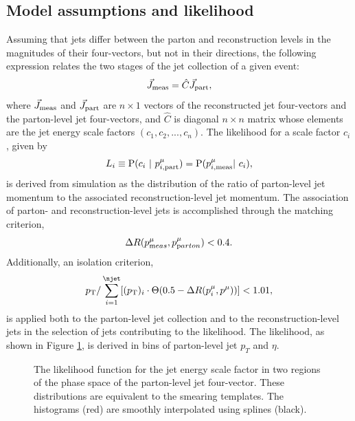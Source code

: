 \subsection{Model assumptions and likelihood} 
Assuming that jets differ between the parton and reconstruction levels in the magnitudes of their four-vectors, but not in their directions, the following expression relates the two stages of the jet collection of a given event:
\begin{equation}
\vec{J}_{\rm meas} = \hat{C} \vec{J}_{\rm part},
\end{equation}
where $\vec{J}_{\rm meas}$ and $\vec{J}_{\rm part}$ are $n\times 1$ vectors of the reconstructed jet four-vectors and the parton-level jet four-vectors, and $\hat{C}$ is diagonal $n\times n$ matrix whose elements are the jet energy scale factors $(c_1,c_2,...,c_n)$. The likelihood for a scale factor $c_i$, given by
\begin{equation}
L_{i}\equiv{\rm P}(c_i\ |\ p^{\mu}_{i,\rm part})={\rm P}(p^{\mu}_{i,\rm meas}|\ c_{i}),
\label{eq:JetEnergyLikelihood}
\end{equation}
is derived from simulation as the distribution of the ratio of parton-level jet momentum to the associated reconstruction-level jet momentum. The association of parton- and reconstruction-level jets is accomplished through the matching criterion,
\begin{equation}
\Delta R(p^{\mu}_{\textrm meas},p^{\mu}_{\textrm parton})<0.4.
\end{equation}	
Additionally, an isolation criterion,
\begin{equation}
p_{\rm T}/\sum_{i=1}^{\njet}[(p_{\rm T})_{i}\cdot\Theta(0.5-\Delta R(p^{\mu}_{i},p^{\mu}))]<1.01,
\end{equation}
is applied both to the parton-level jet collection and to the reconstruction-level jets in the selection of jets contributing to the likelihood. The likelihood, as shown in Figure \ref{fig:SmearEx}, is derived in bins of parton-level jet $p_T$ and $\eta$.
\begin{figure}[h]
\centering
{}
\caption{The likelihood function for the jet energy scale factor in two regions of the phase space of the parton-level jet four-vector. These distributions are equivalent to the smearing templates. The histograms (red) are smoothly interpolated using splines (black).}
\label{fig:SmearEx}
\end{figure}


